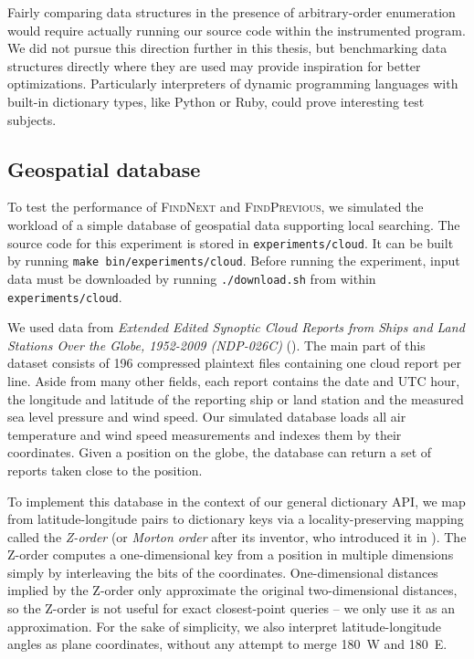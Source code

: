 Fairly comparing data structures in the presence of arbitrary-order enumeration
would require actually running our source code within the instrumented program.
We did not pursue this direction further in this thesis, but benchmarking data
structures directly where they are used may provide inspiration for better
optimizations. Particularly interpreters of dynamic programming languages
with built-in dictionary types, like Python or Ruby, could prove interesting
test subjects.

\subsection{Geospatial database}
To test the performance of \textsc{FindNext} and \textsc{FindPrevious}, we
simulated the workload of a simple database of geospatial data supporting
local searching. The source code for this experiment is stored in
\texttt{experiments/cloud}. It can be built by running \texttt{make
bin/experiments/cloud}. Before running the experiment, input data must
be downloaded by running \texttt{./download.sh} from within
\texttt{experiments/cloud}.

We used data from \emph{Extended Edited Synoptic Cloud Reports from Ships and
Land Stations Over the Globe, 1952-2009 (NDP-026C)} (\cite{cloud-reports}).
The main part of this dataset consists of 196 compressed plaintext files
containing one cloud report per line. Aside from many other fields,
each report contains the date and UTC hour, the longitude and latitude of the
reporting ship or land station and the measured sea level pressure and
wind speed.
Our simulated database loads all air temperature and wind speed measurements
and indexes them by their coordinates. Given a position on the globe, the
database can return a set of reports taken close to the position.

To implement this database in the context of our general dictionary API,
we map from latitude-longitude pairs to dictionary keys via a
locality-preserving mapping called the \emph{Z-order} (or
\emph{Morton order} after its inventor, who introduced it in
\cite{morton-order}). The Z-order computes a one-dimensional key from
a position in multiple dimensions simply by interleaving the bits of
the coordinates. One-dimensional distances implied by the Z-order only
approximate the original two-dimensional distances, so the Z-order is
not useful for exact closest-point queries -- we only use it as an
approximation. For the sake of simplicity, we also interpret
latitude-longitude angles as plane coordinates, without any attempt
to merge 180\textdegree~W and 180\textdegree~E.


